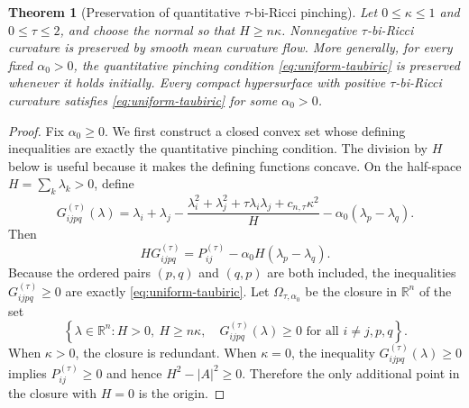\documentclass[11pt,reqno]{amsart}
\newtheorem{theorem}[proposition]{Theorem}
\theoremstyle{definition}
\theoremstyle{remark}
\numberwithin{equation}{section}
\begin{document}
\begin{theorem}[Preservation of quantitative $\tau$-bi-Ricci pinching]
\label{thm:taubiric-preservation}
Let $0\leq\kappa\leq1$ and $0\leq\tau\leq2$, and choose the normal so
that $H\geq n\kappa$.  Nonnegative $\tau$-bi-Ricci curvature is preserved by
smooth mean curvature flow.  More generally, for every fixed
$\alpha_0>0$, the quantitative pinching condition
\eqref{eq:uniform-taubiric} is preserved whenever it holds initially.
Every compact hypersurface with positive $\tau$-bi-Ricci curvature satisfies
\eqref{eq:uniform-taubiric} for some $\alpha_0>0$.
\end{theorem}

\begin{proof}
Fix $\alpha_0\geq0$.  We first construct a closed convex set whose defining
inequalities are exactly the quantitative pinching condition.  The division by
$H$ below is useful because it makes the defining functions concave.  On the
half-space $H=\sum_k\lambda_k>0$, define
\begin{equation*}
 G_{ijpq}^{(\tau)}(\lambda)
 =\lambda_i+\lambda_j
 -\frac{\lambda_i^2+\lambda_j^2+\tau\lambda_i\lambda_j
              +c_{n,\tau}\kappa^2}{H}
 -\alpha_0(\lambda_p-\lambda_q).
\end{equation*}
Then
\begin{equation}\label{s2.HG}
 HG_{ijpq}^{(\tau)}
 =P_{ij}^{(\tau)}-\alpha_0 H(\lambda_p-\lambda_q).
\end{equation}
Because the ordered pairs $(p,q)$ and $(q,p)$ are both included, the
inequalities $G_{ijpq}^{(\tau)}\geq0$ are exactly
\eqref{eq:uniform-taubiric}.  Let $\Omega_{\tau,\alpha_0}$ be the closure in $\mathbb{R}^n$ of the set 
\begin{equation*}
\left\{\lambda\in\mathbb R^n:H>0,\ H\geq n\kappa,\quad
 G_{ijpq}^{(\tau)}(\lambda)\geq0
 \text{ for all }i\ne j,p,q\right\}.
\end{equation*}
When $\kappa>0$, the closure is redundant. When $\kappa=0$, the inequality  $G_{ijpq}^{(\tau)}(\lambda)\geq0$ implies $P_{ij}^{(\tau)}\geq0$ and hence $H^2-|A|^2\geq0$. Therefore the only additional point in the closure with $H=0$  is the origin.


\end{proof}
\end{document}
